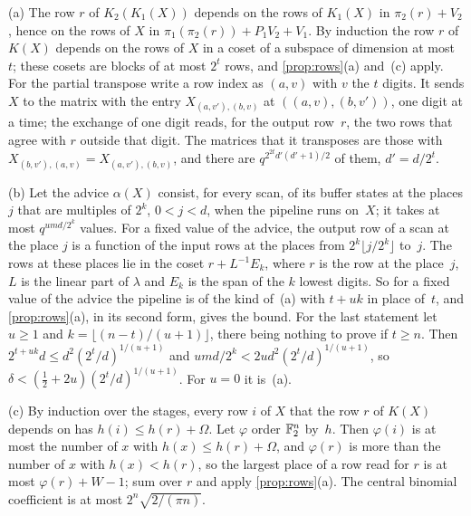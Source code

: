 \begin{informalproof}
(a) The row $r$ of $K_2(K_1(X))$ depends on the rows of $K_1(X)$ in $\pi_2(r)+V_2$, hence on the rows of $X$ in
$\pi_1(\pi_2(r))+P_1V_2+V_1$. By induction the row $r$ of $K(X)$ depends on the rows of $X$ in a coset of a subspace
of dimension at most~$t$; these cosets are blocks of at most $2^t$ rows, and \cref{prop:rows}(a) and~(c) apply. For
the partial transpose write a row index as $(a,v)$ with $v$ the $t$ digits. It sends $X$ to the matrix with the
entry $X_{(a,v'),(b,v)}$ at $((a,v),(b,v'))$, one digit at a time; the exchange of one digit reads, for the output
row~$r$, the two rows that agree with $r$ outside that digit. The matrices that it transposes are those with
$X_{(b,v'),(a,v)}=X_{(a,v'),(b,v)}$, and there are $q^{2^{2t}d'(d'+1)/2}$ of them, $d'=d/2^t$.

(b) Let the advice $\alpha(X)$ consist, for every scan, of its buffer states at the places $j$ that are multiples
of $2^k$, $0<j<d$, when the pipeline runs on~$X$; it takes at most $q^{umd/2^k}$ values. For a fixed value of the
advice, the output row of a scan at the place $j$ is a function of the input rows at the places from
$2^k\lfloor j/2^k\rfloor$ to~$j$. The rows at these places lie in the coset $r+L^{-1}E_k$, where $r$ is the row at the
place~$j$, $L$ is the linear part of $\lambda$ and $E_k$ is the span of the $k$ lowest digits. So for a fixed value of
the advice the pipeline is of the kind of~(a) with $t+uk$ in place of~$t$, and \cref{prop:rows}(a), in its second
form, gives the bound. For the last statement let $u\ge1$ and $k=\lfloor(n-t)/(u+1)\rfloor$, there being nothing to
prove if $t\ge n$. Then $2^{t+uk}d\le d^2(2^t/d)^{1/(u+1)}$ and $umd/2^k<2ud^2(2^t/d)^{1/(u+1)}$, so
$\delta<(\tfrac12+2u)(2^t/d)^{1/(u+1)}$. For $u=0$ it is~(a).

(c) By induction over the stages, every row $i$ of $X$ that the row $r$ of $K(X)$ depends on has
$h(i)\le h(r)+\Omega$. Let $\varphi$ order $\mathbb{F}_2^n$ by~$h$. Then $\varphi(i)$ is at most the number of $x$ with
$h(x)\le h(r)+\Omega$, and $\varphi(r)$ is more than the number of $x$ with $h(x)<h(r)$, so the largest place of a
row read for $r$ is at most $\varphi(r)+W-1$; sum over $r$ and apply \cref{prop:rows}(a). The central binomial
coefficient is at most $2^n\sqrt{2/(\pi n)}$.
\end{informalproof}

